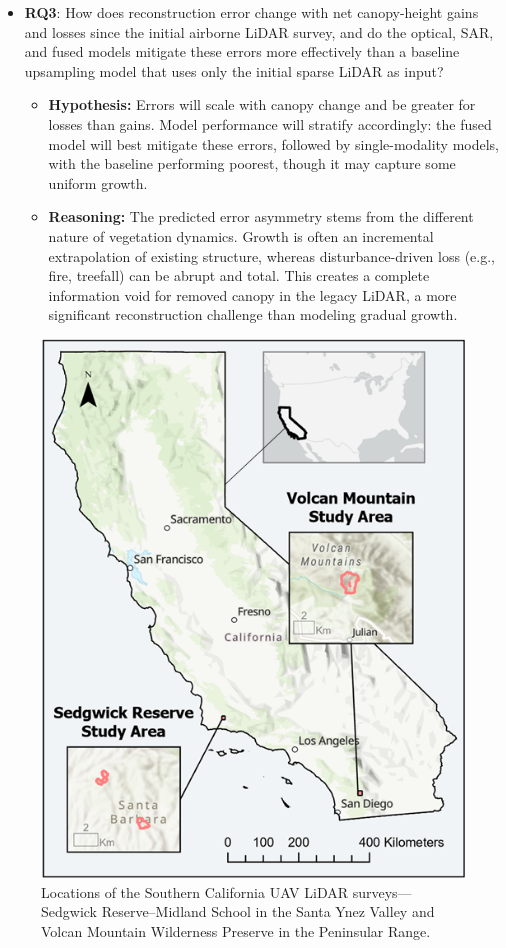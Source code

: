 \documentclass[remotesensing,article,submit,pdftex,moreauthors]{Definitions/mdpi}
\begin{document}
\begin{itemize}
  \item \textbf{RQ3}: How does reconstruction error change with net canopy-height gains and losses since the initial airborne LiDAR survey, and do the optical, SAR, and fused models mitigate these errors more effectively than a baseline upsampling model that uses only the initial sparse LiDAR as input?
        \begin{itemize}
            \item \textbf{Hypothesis:} Errors will scale with canopy change and be greater for losses than gains. Model performance will stratify accordingly: the fused model will best mitigate these errors, followed by single-modality models, with the baseline performing poorest, though it may capture some uniform growth.
            \item \textbf{Reasoning:} The predicted error asymmetry stems from the different nature of vegetation dynamics. Growth is often an incremental extrapolation of existing structure, whereas disturbance-driven loss (e.g., fire, treefall) can be abrupt and total. This creates a complete information void for removed canopy in the legacy LiDAR, a more significant reconstruction challenge than modeling gradual growth.
        \end{itemize}
\end{itemize} 

\begin{figure}[!t]
  \centering
  \includegraphics[width=0.65\linewidth]{manuscript/figures/Overall_Study_Areas_v2.png}
    \caption{Locations of the Southern California UAV LiDAR surveys—Sedgwick
           Reserve–Midland School in the Santa Ynez Valley and Volcan Mountain
           Wilderness Preserve in the Peninsular Range.}
  \label{fig:overall_study_area}
\end{figure}
\end{document}
